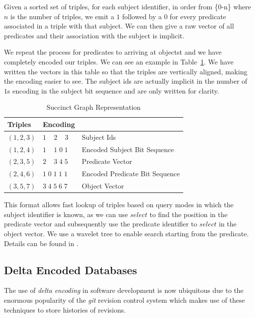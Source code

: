 \documentclass[10pt, a4paper, twocolumn]{article} %
\begin{document}
Given a sorted set of triples, for each subject identifier, in order
from \{0-n\} where \(n\) is the number of triples, we emit a \(1\)
followed by a \(0\) for every predicate associated in a triple with
that subject. We can then give a raw vector of all predicates and
their association with the subject is implicit.

We repeat the process for predicates to arriving at objectst and we
have completely encoded our triples. We can see an example in
Table~\ref{tab:graph}. We have written the vectors in this table so
that the triples are vertically aligned, making the encoding easier to
see. The subject ids are actually implicit in the number of \(1\)s
encoding in the subject bit sequence and are only written for clarity.

\begin{table}
	\centering
	\begin{tabular}{l|l|l}
		\toprule
		Triples & Encoding & \\
		\midrule
        \(  (1, 2, 3) \)  & \(1\;\;\;\;2\;\;\;\;3\) & Subject Ids \\
        \(  (1, 2, 4) \)  & \(1\;\;\;\;1\; 0\; 1\) & Encoded Subject Bit Sequence\\
        \(  (2, 3, 5) \)  & \(2\;\;\;\;3\; 4\; 5\) & Predicate Vector \\
	    \(  (2, 4, 6) \)  & \(1\; 0\;  1\; 1\; 1\) & Encoded Predicate Bit Sequence\\
	    \(  (3, 5, 7) \)  & \(3\; 4\;  5\; 6\; 7\) & Object Vector \\
		\bottomrule
	\end{tabular}
    \caption{Succinct Graph Representation}
    \label{tab:graph}
\end{table}

This format allows fast lookup of triples based on query modes in
which the subject identifier is known, as we can use \(select\) to
find the position in the predicate vector and subsequently use the
predicate identifier to \(select\) in the object vector. We use a
wavelet tree to enable search starting from the predicate. Details can
be found in \cite{10.1007/978-3-642-30284-8_36}.

\subsection{Delta Encoded Databases}

The use of {\em delta encoding} in software development is now
ubiquitous due to the enormous popularity of the {\em git} revision
control system which makes use of these techniques to store histories
of revisions.
\end{document}
